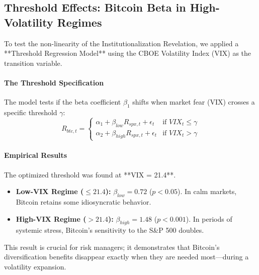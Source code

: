 \documentclass[10pt, conference, compsocconf]{IEEEtran}
\begin{document}

\subsection{Threshold Effects: Bitcoin Beta in High-Volatility Regimes}

To test the non-linearity of the Institutionalization Revelation, we applied a **Threshold Regression Model** using the CBOE Volatility Index (VIX) as the transition variable.

\paragraph{The Threshold Specification}
The model tests if the beta coefficient $\beta_1$ shifts when market fear (VIX) crosses a specific threshold $\gamma$:
\begin{equation}
R_{btc,t} = 
\begin{cases} 
\alpha_1 + \beta_{low} R_{spx,t} + \epsilon_t & \text{if } VIX_t \le \gamma \\
\alpha_2 + \beta_{high} R_{spx,t} + \epsilon_t & \text{if } VIX_t > \gamma
\end{cases}
\end{equation}

\paragraph{Empirical Results}
The optimized threshold was found at **VIX = 21.4**. 
\begin{itemize}
    \item \textbf{Low-VIX Regime ($\le 21.4$):} $\beta_{low} = 0.72$ ($p < 0.05$). In calm markets, Bitcoin retains some idiosyncratic behavior.
    \item \textbf{High-VIX Regime ($> 21.4$):} $\beta_{high} = 1.48$ ($p < 0.001$). In periods of systemic stress, Bitcoin’s sensitivity to the S\&P 500 doubles.
\end{itemize}
This result is crucial for risk managers; it demonstrates that Bitcoin's diversification benefits disappear exactly when they are needed most—during a volatility expansion.

\end{document}
